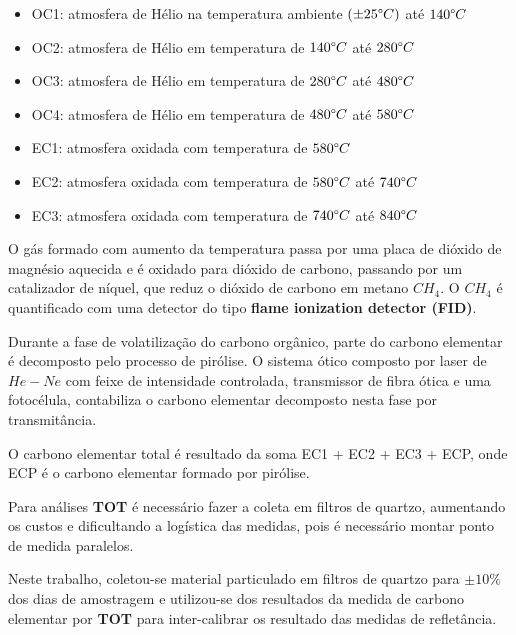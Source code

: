 \begin{itemize}
  \item OC1: atmosfera de Hélio na temperatura ambiente $(\pm 25 \degree C)$ até $140 \degree C$
  \item OC2: atmosfera de Hélio em temperatura de $140 \degree C$ até $280 \degree C$
  \item OC3: atmosfera de Hélio em temperatura de $280 \degree C$ até $480 \degree C$
  \item OC4: atmosfera de Hélio em temperatura de $480 \degree C$ até $580 \degree C$
  \item EC1: atmosfera oxidada com temperatura de $580 \degree C$
  \item EC2: atmosfera oxidada com temperatura de $580 \degree C$ até $740 \degree C$
  \item EC3: atmosfera oxidada com temperatura de $740 \degree C$ até $840 \degree C$
\end{itemize}

O gás formado com aumento da temperatura passa por uma placa de dióxido de magnésio 
aquecida e é oxidado para dióxido de carbono, passando por um catalizador de níquel, 
que reduz o dióxido de carbono em metano $CH_4$.
O $CH_4$ é quantificado com uma detector do tipo 
\textbf{flame ionization detector (FID)}.

Durante a fase de volatilização do carbono orgânico, parte do carbono elementar
é decomposto pelo processo de pirólise. 
O sistema ótico composto por laser de $He-Ne$ com feixe de intensidade controlada, 
transmissor de fibra ótica e uma fotocélula, contabiliza o carbono elementar
decomposto nesta fase por transmitância.

O carbono elementar total é resultado da soma EC1 + EC2 + EC3 + ECP,
onde ECP é o carbono elementar formado por pirólise. 

Para análises \textbf{TOT} é necessário fazer a coleta em filtros
de quartzo, aumentando os custos e dificultando a logística das medidas, 
pois é necessário montar ponto de medida paralelos.  

Neste trabalho, coletou-se material particulado em filtros de 
quartzo para $\pm 10\%$ dos dias de amostragem e utilizou-se
dos resultados da medida de carbono elementar por \textbf{TOT} 
para inter-calibrar os resultado das medidas de refletância. 
